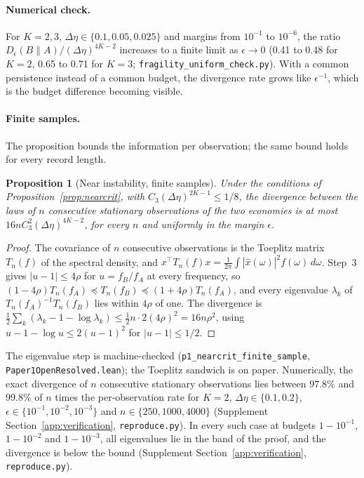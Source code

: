 \documentclass[12pt]{article}
\newtheorem{proposition}[theorem]{Proposition}
\theoremstyle{definition}
\theoremstyle{remark}
\begin{document}
\paragraph{Numerical check.} For $K=2,3$, $\Delta\eta\in\{0.1,0.05,0.025\}$ and margins from $10^{-1}$ to $10^{-6}$, the ratio $D_\epsilon(B\|A)/(\Delta\eta)^{4K-2}$ increases to a finite limit as $\epsilon\to0$ (0.41 to 0.48 for $K=2$, 0.65 to 0.71 for $K=3$; \nolinkurl{fragility_uniform_check.py}). With a common persistence instead of a common budget, the divergence rate grows like $\epsilon^{-1}$, which is the budget difference becoming visible.


\paragraph{Finite samples.} The proposition bounds the information per observation; the same bound holds for every record length.

\begin{proposition}[Near instability, finite samples]\label{prop:nearcritn}
Under the conditions of Proposition~\ref{prop:nearcrit}, with $C_3(\Delta\eta)^{2K-1}\le1/8$, the divergence between the laws of $n$ consecutive stationary observations of the two economies is at most $16nC_3^2(\Delta\eta)^{4K-2}$, for every $n$ and uniformly in the margin $\epsilon$.
\end{proposition}

\begin{proof}
The covariance of $n$ consecutive observations is the Toeplitz matrix $T_n(f)$ of the spectral density, and $x^\top T_n(f)x=\frac1{2\pi}\int|\hat x(\omega)|^2f(\omega)\,d\omega$. Step~3 gives $|u-1|\le4\rho$ for $u=f_B/f_A$ at every frequency, so $(1-4\rho)T_n(f_A)\preceq T_n(f_B)\preceq(1+4\rho)T_n(f_A)$, and every eigenvalue $\lambda_k$ of $T_n(f_A)^{-1}T_n(f_B)$ lies within $4\rho$ of one. The divergence is $\frac12\sum_k(\lambda_k-1-\log\lambda_k)\le\frac12n\cdot2(4\rho)^2=16n\rho^2$, using $u-1-\log u\le2(u-1)^2$ for $|u-1|\le1/2$.
\end{proof}

The eigenvalue step is machine-checked (\texttt{p1\_nearcrit\_finite\_sample}, \nolinkurl{Paper1OpenResolved.lean}); the Toeplitz sandwich is on paper. Numerically, the exact divergence of $n$ consecutive stationary observations lies between $97.8\%$ and $99.8\%$ of $n$ times the per-observation rate for $K=2$, $\Delta\eta\in\{0.1,0.2\}$, $\epsilon\in\{10^{-1},10^{-2},10^{-3}\}$ and $n\in\{250,1000,4000\}$ (Supplement Section~\ref{app:verification}, \nolinkurl{reproduce.py}). In every such case at budgets $1-10^{-1}$, $1-10^{-2}$ and $1-10^{-3}$, all eigenvalues lie in the band of the proof, and the divergence is below the bound (Supplement Section~\ref{app:verification}, \nolinkurl{reproduce.py}).
\end{document}
